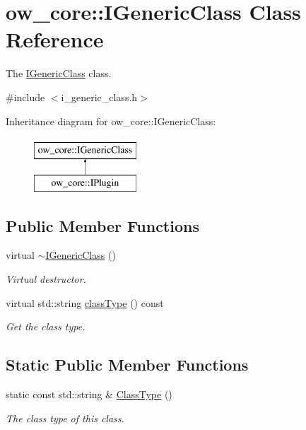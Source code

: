\hypertarget{classow__core_1_1IGenericClass}{}\section{ow\+\_\+core\+:\+:I\+Generic\+Class Class Reference}
\label{classow__core_1_1IGenericClass}


The \hyperlink{classow__core_1_1IGenericClass}{I\+Generic\+Class} class.  




{\ttfamily \#include $<$i\+\_\+generic\+\_\+class.\+h$>$}

Inheritance diagram for ow\+\_\+core\+:\+:I\+Generic\+Class\+:\begin{figure}[H]
\begin{center}
\leavevmode
\includegraphics[height=2.000000cm]{da/d72/classow__core_1_1IGenericClass}
\end{center}
\end{figure}
\subsection*{Public Member Functions}
\begin{DoxyCompactItemize}
\item 
virtual \hyperlink{classow__core_1_1IGenericClass_aa0bef13a4de1a0fed78a8e3d3d8a417e}{$\sim$\+I\+Generic\+Class} ()\hypertarget{classow__core_1_1IGenericClass_aa0bef13a4de1a0fed78a8e3d3d8a417e}{}\label{classow__core_1_1IGenericClass_aa0bef13a4de1a0fed78a8e3d3d8a417e}

\begin{DoxyCompactList}\small\item\em Virtual destructor. \end{DoxyCompactList}\item 
virtual std\+::string \hyperlink{classow__core_1_1IGenericClass_ad6ca32fd7189a4bd71c01c10e3677ae4}{class\+Type} () const 
\begin{DoxyCompactList}\small\item\em Get the class type. \end{DoxyCompactList}\end{DoxyCompactItemize}
\subsection*{Static Public Member Functions}
\begin{DoxyCompactItemize}
\item 
static const std\+::string \& \hyperlink{classow__core_1_1IGenericClass_acf2c60d6dde7803ceb855a3f8a3e24b3}{Class\+Type} ()
\begin{DoxyCompactList}\small\item\em The class type of this class. \end{DoxyCompactList}\end{DoxyCompactItemize}


